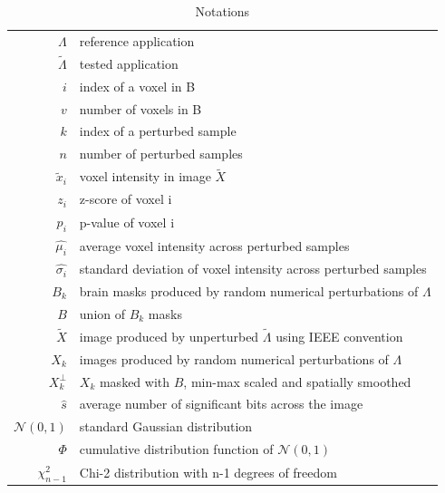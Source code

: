 \documentclass[lettersize,journal]{IEEEtran}
\begin{document}
\begin{table}
  \centering
  \begin{tabular}{r|l}
    $\Lambda$          & reference application                                                \\
    $\tilde \Lambda$   & tested application                                                   \\
    $i$                & index of a voxel in B                                                \\
    $v$                & number of voxels in B                                                \\
    $k$                & index of a perturbed sample                                          \\
    $n$                & number of perturbed samples                                          \\
    $\tilde x_i$       & voxel intensity in image $\tilde X$                                  \\
    $z_i$              & z-score of voxel i                                                   \\
    $p_i$              & p-value of voxel i                                                   \\
    $\hat{\mu_i}$      & average voxel intensity across perturbed samples                     \\
    $\hat{\sigma_i}$   & standard deviation of voxel intensity across perturbed samples       \\
    $B_k$              & brain masks produced by random numerical perturbations of $\Lambda$  \\
    $B$                & union of $B_k$ masks                                                 \\
    $\tilde X$         & image produced by unperturbed $\tilde \Lambda$ using IEEE convention \\
    $X_k$              & images produced by random numerical perturbations of $\Lambda$       \\
    $X_k^{\perp}$      & $X_k$ masked with $B$, min-max scaled and spatially smoothed         \\
    $\hat{s}$          & average number of significant bits across the image                  \\
    $\mathcal{N}(0,1)$ & standard Gaussian distribution                                       \\
    $\Phi$             & cumulative distribution function of $\mathcal{N}(0,1)$               \\
    $\chi^2_{n-1}$     & Chi-2 distribution with n-1 degrees of freedom                       \\
  \end{tabular}
  \caption{Notations}
  \label{tab:notations}
\end{table}
\end{document}
